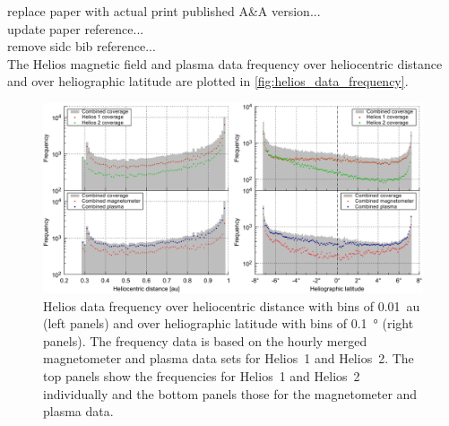 replace paper with actual print published A\&A version...\\
update paper reference...\\
remove sidc bib reference...\\


The Helios magnetic field and plasma data frequency over heliocentric distance and over heliographic latitude are plotted in \autoref{fig:helios_data_frequency}.\\
\begin{figure}[htb]
	\centering
	\includegraphics[width=\textwidth]{figures_of_mine/gnuplots/helios_data_frequency.pdf}
	\caption[]
	{Helios data frequency over heliocentric distance with bins of \SI{0.01}{au} (left panels) and over heliographic latitude with bins of \SI{0.1}{\degree} (right panels). The frequency data is based on the hourly merged magnetometer and plasma data sets for Helios~1 and Helios~2. The top panels show the frequencies for Helios~1 and Helios~2 individually and the bottom panels those for the magnetometer and plasma data.}
	\label{fig:helios_data_frequency}
\end{figure}




\cleardoublepage
